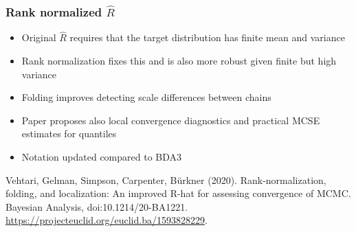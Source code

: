 \documentclass[finnish,english,t]{beamer}
\begin{document}
\begin{frame}[fragile]
  \frametitle{Rank normalized $\widehat{R}$}

  \begin{itemize}
  \item<+-> Original $\widehat{R}$ requires that the target distribution
    has finite mean and variance
  \item<+-> Rank normalization fixes this and is also more robust given
    finite but high variance
  \item<+-> Folding improves detecting scale differences between chains
  \item<+-> Paper proposes also local convergence diagnostics and
    practical MCSE estimates for quantiles
  \item<+-> Notation updated compared to BDA3 
  \end{itemize}  

    Vehtari, Gelman, Simpson, Carpenter, Bürkner
  (2020). Rank-normalization, folding, and localization: An improved
  R-hat for assessing convergence of MCMC. Bayesian Analysis, doi:10.1214/20-BA1221. \url{https://projecteuclid.org/euclid.ba/1593828229}.

\end{frame}

  




\end{document}
